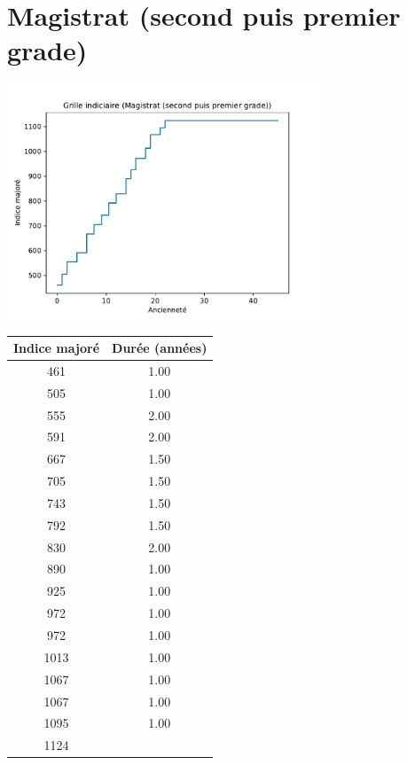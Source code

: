 \newpage 
 
\chapter{Magistrat (second puis premier grade)} 

\begin{minipage}{0.55\linewidth}\includegraphics[width=0.7\textwidth]{fig/grille_Magistrat.pdf}\end{minipage} 
\begin{minipage}{0.3\linewidth} 
 \begin{center} 

\begin{tabular}[htb]{|c|c|} 
\hline 
 Indice majoré &  Durée (années) \\ 
\hline \hline 
 461 &  1.00 \\ 
\hline 
 505 &  1.00 \\ 
\hline 
 555 &  2.00 \\ 
\hline 
 591 &  2.00 \\ 
\hline 
 667 &  1.50 \\ 
\hline 
 705 &  1.50 \\ 
\hline 
 743 &  1.50 \\ 
\hline 
 792 &  1.50 \\ 
\hline 
 830 &  2.00 \\ 
\hline 
 890 &  1.00 \\ 
\hline 
 925 &  1.00 \\ 
\hline 
 972 &  1.00 \\ 
\hline 
 972 &  1.00 \\ 
\hline 
 1013 &  1.00 \\ 
\hline 
 1067 &  1.00 \\ 
\hline 
 1067 &  1.00 \\ 
\hline 
 1095 &  1.00 \\ 
\hline 
 1124 &   \\ 
\hline 
\hline 
\end{tabular} 
\end{center} 
 \end{minipage} 


